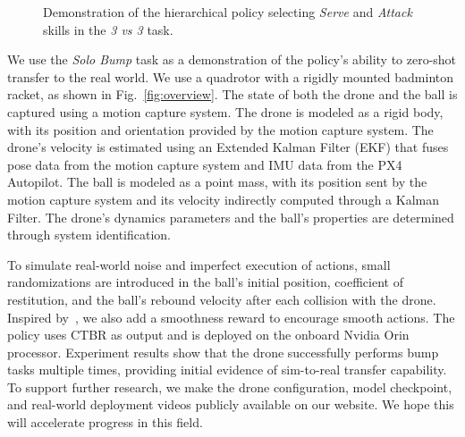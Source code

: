 \begin{figure}[t]
    \centering
    \hfill
    \vspace{-2mm}
    \caption{Demonstration of the hierarchical policy selecting \textit{Serve} and \textit{Attack} skills in the \textit{3 vs 3} task.}
    \label{fig:hier}
    \vspace{-4mm}
\end{figure}

We use the \textit{Solo Bump} task as a demonstration of the policy’s ability to zero-shot transfer to the real world. We use a quadrotor with a rigidly mounted badminton racket, as shown in Fig.~\ref{fig:overview}. The state of both the drone and the ball is captured using a motion capture system. The drone is modeled as a rigid body, with its position and orientation provided by the motion capture system. The drone's velocity is estimated using an Extended Kalman Filter (EKF) that fuses pose data from the motion capture system and IMU data from the PX4 Autopilot. The ball is modeled as a point mass, with its position sent by the motion capture system and its velocity indirectly computed through a Kalman Filter. The drone's dynamics parameters and the ball’s properties are determined through system identification.

To simulate real-world noise and imperfect execution of actions, small randomizations are introduced in the ball’s initial position, coefficient of restitution, and the ball's rebound velocity after each collision with the drone. Inspired by~\cite{chen2024matterslearningzeroshotsimtoreal}, we also add a smoothness reward to encourage smooth actions. The policy uses CTBR as output and is deployed on the onboard Nvidia Orin processor.
Experiment results show that the drone successfully performs bump tasks multiple times, providing initial evidence of sim-to-real transfer capability. To support further research, we make the drone configuration, model checkpoint, and real-world deployment videos publicly available on our website. We hope this will accelerate progress in this field.